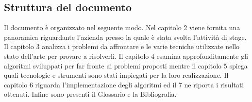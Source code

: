\subsection{Struttura del documento}
Il documento è organizzato nel seguente modo. Nel capitolo 2 viene fornita una panoramica riguardante l'azienda presso la quale è stata svolta l'attività di stage. Il capitolo 3 analizza i problemi da affrontare e le varie tecniche utilizzate nello stato dell'arte per provare a risolverli. Il capitolo 4 esamina approfonditamente gli algoritmi sviluppati per far fronte ai problemi proposti mentre il capitolo 5 spiega quali tecnologie e strumenti sono stati impiegati per la loro realizzazione. Il capitolo 6 riguarda l'implementazione degli algoritmi ed il 7 ne riporta i risultati ottenuti. Infine sono presenti il Glossario e la Bibliografia.

